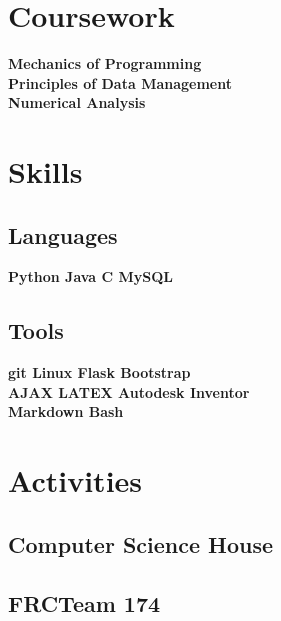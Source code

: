 \documentclass[]{deedy-resume-openfont}
\begin{document}
\begin{minipage}[t]{0.30\textwidth}
\section{Coursework}
\textbf{Mechanics of Programming \\
Principles of Data Management \\
Numerical Analysis}


\section{Skills}
\subsection{Languages}
\textbf{Python \textbullet{} Java \textbullet{} C \textbullet{} MySQL \\}

\vspace{\topsep} %

\subsection{Tools}
\textbf{git \textbullet{} Linux \textbullet{} Flask \textbullet{} Bootstrap \\
AJAX \textbullet{} LATEX \textbullet{} Autodesk Inventor \\
Markdown \textbullet{} Bash}
\sectionsep


\section{Activities}

\subsection{Computer Science House}

\vspace{\topsep} %

\subsection{FRC\textregistered Team 174}

\sectionsep

%
%

\end{minipage}
\end{document}
